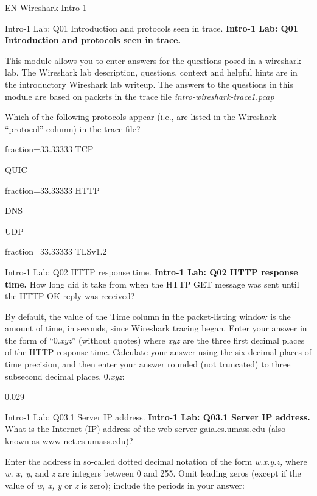 \documentclass[a4paper]{article}
\begin{document}
\begin{quiz}{EN-Wireshark-Intro-1}

\begin{multi}[points=1,multiple]{Intro-1 Lab: Q01 Introduction and protocols seen in trace.}
\textbf{Intro-1 Lab: Q01 Introduction and protocols seen in trace.}

This module allows you to enter answers for the questions posed in a wireshark-lab. The Wireshark lab description, questions, context and helpful hints are in the introductory Wireshark lab writeup. The answers to the questions in this module are based on packets in the trace file \emph{intro-wireshark-trace1.pcap}

Which of the following protocols appear (i.e., are listed in the Wireshark ``protocol'' column) in the trace file? 

\item[fraction=33.33333] TCP
\item QUIC
\item[fraction=33.33333] HTTP
\item DNS
\item UDP
\item[fraction=33.33333] TLSv1.2
\end{multi}

\begin{shortanswer}[points=1]{Intro-1 Lab: Q02 HTTP response time.}
\textbf{Intro-1 Lab: Q02 HTTP response time.} 
How long did it take from when the HTTP GET message was sent until the HTTP OK reply was received? 

By default, the value of the Time column in the packet-listing window is the amount of time, in seconds, since Wireshark tracing began.  Enter your answer in the form of ``0.\emph{xyz}'' (without quotes) where \emph{xyz} are the three first decimal places of the HTTP response time. Calculate your answer using the six decimal places of time precision, and then enter your answer rounded (not truncated) to three subsecond decimal places, 0.\emph{xyz}:

\item 0.029
\end{shortanswer}

\begin{shortanswer}[points=1]{Intro-1 Lab: Q03.1 Server IP address.}
\textbf{Intro-1 Lab: Q03.1 Server IP address.} 
What is the Internet (IP) address of the web server gaia.cs.umass.edu (also known as www-net.cs.umass.edu)? 

Enter the address in so-called dotted decimal notation of the form \emph{w.x.y.z,} where  \emph{w, x, y}, and \emph{z} are integers between 0 and 255. Omit leading zeros (except if the value of \emph{w, x, y} or \emph{z} is zero); include the periods in your answer: 


\end{shortanswer}
\end{quiz}
\end{document}
